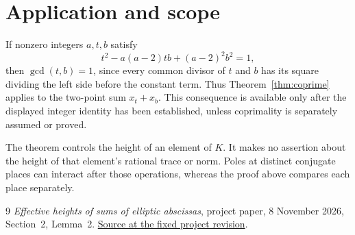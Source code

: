 \documentclass[11pt]{article}
\theoremstyle{remark}\newtheorem{remark}[theorem]{Remark}
\begin{document}
\section{Application and scope}
If nonzero integers $a,t,b$ satisfy
\[
 t^2-a(a-2)tb+(a-2)^2b^2=1,
\]
then $\gcd(t,b)=1$, since every common divisor of $t$ and $b$ has its
square dividing the left side before the constant term.  Thus
Theorem~\ref{thm:coprime} applies to the two-point sum $x_t+x_b$.
This consequence is available only after the displayed integer
identity has been established, unless coprimality is separately
assumed or proved.

The theorem controls the height of an element of $K$.  It makes no
assertion about the height of that element's rational trace or norm.
Poles at distinct conjugate places can interact after those operations,
whereas the proof above compares each place separately.
\begin{thebibliography}{9}
\emph{Effective heights of sums of elliptic abscissas},
project paper, 8 November 2026, Section~2, Lemma~2.
\href{https://github.com/JoseBrox/diophantine-z-q_improvements/blob/e9ee328a77f079b4869ea0cb61f60c686edba0ed/papers/effective_sums/effective_elliptic_sums_20261108_v10.tex}
{Source at the fixed project revision}.
\end{thebibliography}
\end{document}
